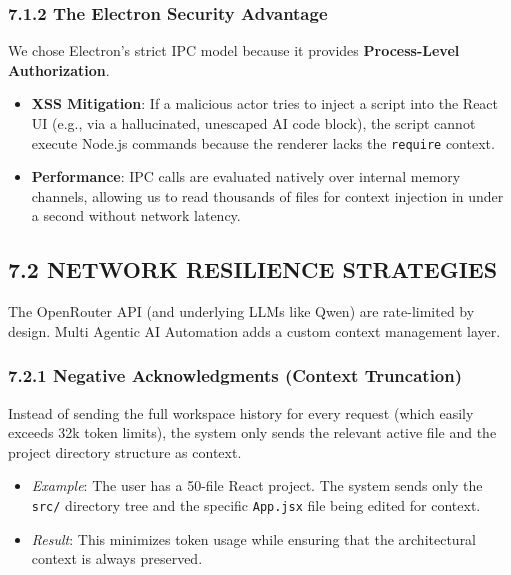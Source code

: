 \documentclass[
  12pt,
]{article}
\providecommand{\tightlist}{%
  \setlength{\itemsep}{0pt}\setlength{\parskip}{0pt}}
\begin{document}
\subsubsection{7.1.2 The Electron Security
Advantage}\label{the-electron-security-advantage}

We chose Electron's strict IPC model because it provides
\textbf{Process-Level Authorization}.

\begin{itemize}
\tightlist
\item
  \textbf{XSS Mitigation}: If a malicious actor tries to inject a script
  into the React UI (e.g., via a hallucinated, unescaped AI code block),
  the script cannot execute Node.js commands because the renderer lacks
  the \texttt{require} context.
\item
  \textbf{Performance}: IPC calls are evaluated natively over internal
  memory channels, allowing us to read thousands of files for context
  injection in under a second without network latency.
\end{itemize}

\subsection{7.2 NETWORK RESILIENCE
STRATEGIES}\label{network-resilience-strategies}

The OpenRouter API (and underlying LLMs like Qwen) are rate-limited by
design. Multi Agentic AI Automation adds a custom context management
layer.

\subsubsection{7.2.1 Negative Acknowledgments (Context
Truncation)}\label{negative-acknowledgments-context-truncation}

Instead of sending the full workspace history for every request (which
easily exceeds 32k token limits), the system only sends the relevant
active file and the project directory structure as context.

\begin{itemize}
\tightlist
\item
  \emph{Example}: The user has a 50-file React project. The system sends
  only the \texttt{src/} directory tree and the specific
  \texttt{App.jsx} file being edited for context.
\item
  \emph{Result}: This minimizes token usage while ensuring that the
  architectural context is always preserved.
\end{itemize}
\end{document}
